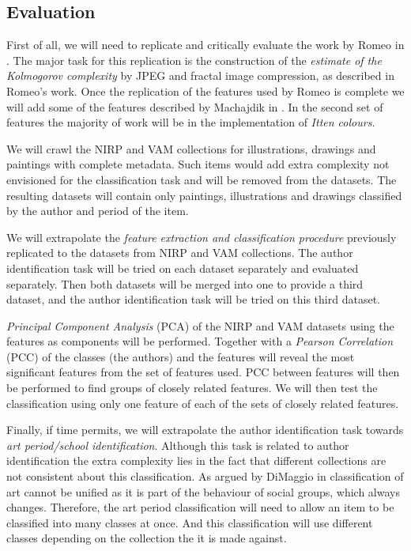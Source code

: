 \documentclass[a4paper,twocolumn]{article}
\begin{document}

\subsection{Evaluation}

First of all, we will need to replicate and critically evaluate the work by
Romeo in \cite{rmc12ajs}.  The major task for this replication is the
construction of the \emph{estimate of the Kolmogorov complexity} by JPEG and
fractal image compression, as described in Romeo's work. Once the replication
of the features used by Romeo is complete we will add some of the features
described by Machajdik in \cite{mach10clas}.  In the second set of features the
majority of work will be in the implementation of \emph{Itten colours}.

We will crawl the NIRP and VAM collections for illustrations, drawings and
paintings with complete metadata.  Such items would add extra complexity not
envisioned for the classification task and will be removed from the datasets.
The resulting datasets will contain only paintings, illustrations and drawings
classified by the author and period of the item.

We will extrapolate the \emph{feature extraction and classification procedure}
previously replicated to the datasets from NIRP and VAM collections.  The
author identification task will be tried on each dataset separately and
evaluated separately.  Then both datasets will be merged into one to provide a
third dataset, and the author identification task will be tried on this third
dataset.

\emph{Principal Component Analysis} (PCA) of the NIRP and VAM datasets using
the features as components will be performed.  Together with a \emph{Pearson
Correlation} (PCC) of the classes (the authors) and the features will reveal
the most significant features from the set of features used.  PCC between
features will then be performed to find groups of closely related features.  We
will then test the classification using only one feature of each of the sets of
closely related features.

Finally, if time permits, we will extrapolate the author identification task
towards \emph{art period/school identification}.  Although this task is related
to author identification the extra complexity lies in the fact that different
collections are not consistent about this classification.  As argued by
DiMaggio in \cite{dimaggio87art} classification of art cannot be unified as it
is part of the behaviour of social groups, which always changes.  Therefore,
the art period classification will need to allow an item to be classified into
many classes at once.  And this classification will use different classes
depending on the collection the it is made against.
\end{document}
